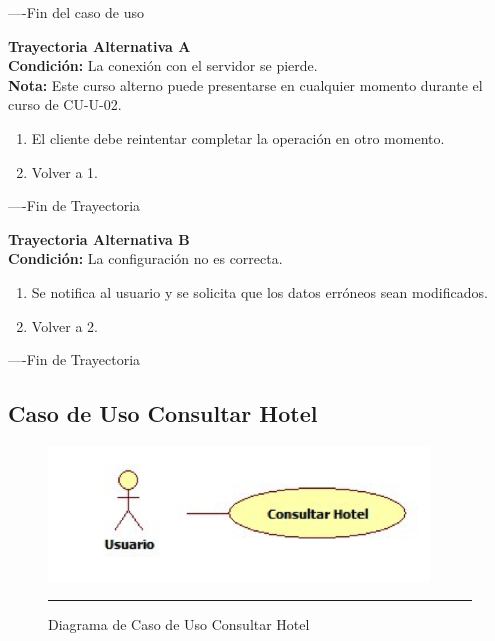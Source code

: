 ----Fin del caso de uso

\begin{flushleft}
	\hypertarget{TrayectoriaA_CU-U-02}{}
	\textbf{Trayectoria Alternativa A}\\
	\textbf{Condición:} La conexión con el servidor se pierde. \\
	\textbf{Nota: } Este curso alterno puede presentarse en cualquier momento durante el curso de CU-U-02.\\
	\begin{enumerate}
		\item El cliente debe reintentar completar la operación en otro momento. 
		\item Volver a 1. 
	\end{enumerate}
\end{flushleft}
----Fin de Trayectoria

\begin{flushleft}
	\hypertarget{TrayectoriaB_CU-U-02}{}
	\textbf{Trayectoria Alternativa B}\\
	\textbf{Condición:} La configuración no es correcta.  \\
	\begin{enumerate}
		\item Se notifica al usuario y se solicita que los datos erróneos sean modificados. 
		\item Volver a 2.
	\end{enumerate}
\end{flushleft}
----Fin de Trayectoria
\newpage
\subsection{Caso de Uso Consultar Hotel}

\begin{figure}[htbp]
	\centering
		\includegraphics[width=0.9\textwidth]{Figuras/cuConsultarHotel.png}
		\rule{30em}{0.5pt}
	\caption[Diagrama de Caso de Uso Consultar Hotel]{Diagrama de Caso de Uso Consultar Hotel}
	\label{fig:cuConsultarHotel}
\end{figure}

